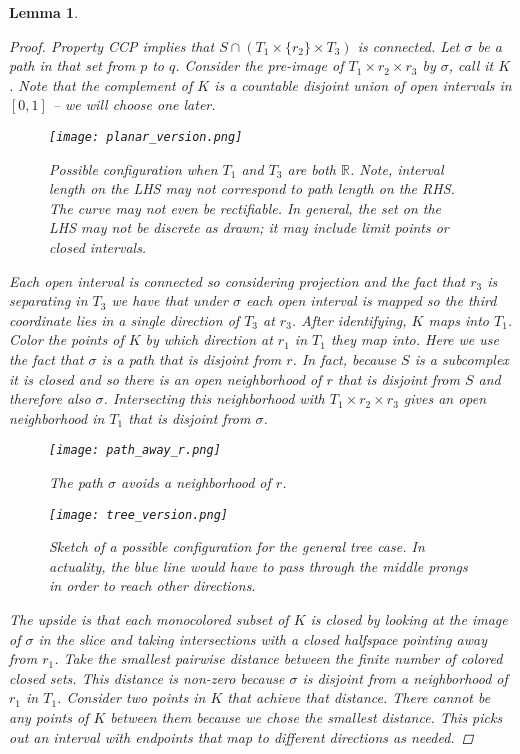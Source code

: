 \documentclass[12pt,parskip=full]{report}
\theoremstyle{plain}
\newtheorem{lem}[thm]{Lemma}
\theoremstyle{definition}
\begin{document}
\begin{lem}
    \begin{proof}
        Property CCP implies that \(S \cap (T_{1} \times \{r_{2}\} \times T_{3} )\) is connected. Let \(\sigma\) be a path in that set from \(p\) to \(q\). Consider the pre-image of \(T_{1} \times r_{2} \times r_{3}\) by \(\sigma\), call it \(K\). Note that the complement of \(K\) is a countable disjoint union of open intervals in \([0,1]\) -- we will choose one later. 
\begin{figure}[htp]
    \centering
    \texttt{[image: planar\_version.png]}
    \caption{Possible configuration when $T_1$ and $T_3$ are both $\mathbb{R}$. Note, interval length on the LHS may not correspond to path length on the RHS. The curve may not even be rectifiable. In general, the set on the LHS may not be discrete as drawn; it may include limit points or closed intervals.}
    \label{fig:square}
\end{figure}
        Each open interval is connected so considering projection and the fact that \(r_{3}\) is separating in \(T_{3}\) we have that under \(\sigma\) each open interval is mapped so the third coordinate lies in a single direction of \(T_{3}\) at \(r_{3}\). After identifying, \(K\) maps into \(T_{1}\). Color the points of \(K\) by which direction at \(r_1\) in \(T_{1}\) they map into. Here we use the fact that \(\sigma\) is a path that is disjoint from \(r\). In fact, because \(S\) is a subcomplex it is closed and so there is an open neighborhood of \(r\) that is disjoint from \(S\) and therefore also  \(\sigma\). Intersecting this neighborhood with \(T_{1} \times r_{2} \times r_{3}\) gives an open neighborhood in \(T_{1}\) that is disjoint from \(\sigma\). 
\begin{figure}[!h]
    \centering
    \texttt{[image: path\_away\_r.png]}
    \caption{The path $\sigma$ avoids a neighborhood of $r$.}
    \label{fig:square}
\end{figure}
\begin{figure}[!h]
    \centering
    \texttt{[image: tree\_version.png]}
    \caption{Sketch of a possible configuration for the general tree case. In actuality, the blue line would have to pass through the middle prongs in order to reach other directions.}
    \label{fig:square}
\end{figure}
        The upside is that each monocolored subset of \(K\) is closed by looking at the image of \(\sigma\) in the slice and taking intersections with a closed halfspace pointing away from \(r_{1}\). Take the smallest pairwise distance between the finite number of colored closed sets. This distance is non-zero because \(\sigma\) is disjoint from a neighborhood of $r_1$ in $T_1$. Consider two points in \(K\) that achieve that distance. There cannot be any points of \(K\) between them because we chose the smallest distance. This picks out an interval with endpoints that map to different directions as needed.
     \end{proof}
\end{lem}
\end{document}
